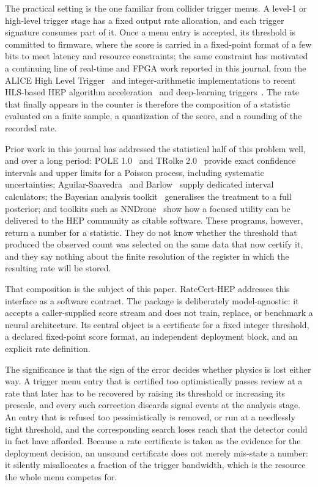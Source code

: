 \documentclass[preprint,12pt]{elsarticle}
\begin{document}
The practical setting is the one familiar from collider trigger menus.  A
level-1 or high-level trigger stage has a fixed output rate allocation, and each
trigger signature consumes part of it.  Once a menu entry is accepted, its
threshold is committed to firmware, where the score is carried in a fixed-point
format of a few bits to meet latency and resource constraints; the same
constraint has motivated a continuing line of real-time and FPGA work reported in
this journal, from the ALICE High Level Trigger~\cite{ALICEHLT2019} and
integer-arithmetic implementations to recent HLS-based HEP algorithm
acceleration~\cite{Wojenski2024HLS} and deep-learning
triggers~\cite{Tyson2023CLAS12}.  The rate that finally appears in the counter
is therefore the composition of a statistic evaluated on a finite sample, a
quantization of the score, and a rounding of the recorded rate.

Prior work in this journal has addressed the statistical half of this problem
well, and over a long period: POLE 1.0~\cite{Conrad2004POLE} and
TRolke 2.0~\cite{Lundberg2010TRolke} provide exact confidence intervals and
upper limits for a Poisson process, including systematic uncertainties;
Aguilar-Saavedra~\cite{AguilarSaavedra2000} and Barlow~\cite{Barlow2002}
supply dedicated interval calculators; the Bayesian analysis
toolkit~\cite{BAT2009} generalises the treatment to a full posterior; and
toolkits such as NNDrone~\cite{Benson2019NNDrone} show how a focused utility can
be delivered to the HEP community as citable software.  These
programs, however, return a number for a statistic.  They do not know whether
the threshold that produced the observed count was selected on the same data
that now certify it, and they say nothing about the finite resolution of the
register in which the resulting rate will be stored.

That composition is the subject of this paper.  RateCert-HEP addresses this
interface as a software contract.  The package is deliberately model-agnostic:
it accepts a caller-supplied score stream and does not train, replace, or
benchmark a neural architecture.  Its central object is a certificate for a
fixed integer threshold, a declared fixed-point score format, an independent
deployment block, and an explicit rate definition.

The significance is that the sign of the error decides whether physics is lost
either way.  A trigger menu entry that is certified too optimistically passes
review at a rate that later has to be recovered by raising its threshold or
increasing its prescale, and every such correction discards signal events at
the analysis stage.  An entry that is refused too pessimistically is removed,
or run at a needlessly tight threshold, and the corresponding search loses reach
that the detector could in fact have afforded.  Because a rate certificate is
taken as the evidence for the deployment decision, an unsound certificate does
not merely mis-state a number: it silently misallocates a fraction of the
trigger bandwidth, which is the resource the whole menu competes for.
\end{document}
